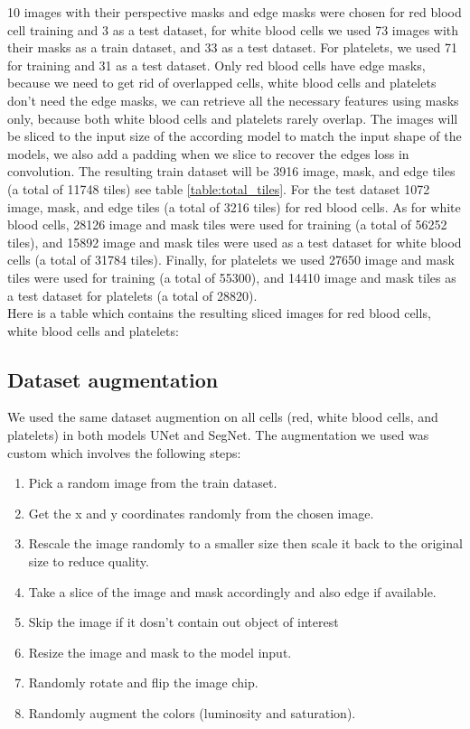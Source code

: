 \documentclass[conference]{IEEEtran}
\begin{document}
10 images with their perspective masks and edge masks were chosen for red blood cell training and 3 as a test dataset, for white blood cells we used 73 images with their masks as a train dataset, and 33 as a test dataset.
For platelets, we used 71 for training and 31 as a test dataset.
Only red blood cells have edge masks, because we need to get rid of overlapped cells, white blood cells and platelets don't need the edge masks, we can retrieve all the necessary features using masks only, because both white blood cells and platelets rarely overlap.
The images will be sliced to the input size of the according model to match the input shape of the models, we also add a padding when we slice to recover the edges loss in convolution.
The resulting train dataset will be 3916 image, mask, and edge tiles (a total of 11748 tiles) see table \ref{table:total_tiles}.
For the test dataset 1072 image, mask, and edge tiles (a total of 3216 tiles) for red blood cells.
As for white blood cells, 28126 image and mask tiles were used for training (a total of 56252 tiles), and 15892 image and mask tiles were used as a test dataset for white blood cells (a total of 31784 tiles).
Finally, for platelets we used 27650 image and mask tiles were used for training (a total of 55300), and 14410 image and mask tiles as a test dataset for platelets (a total of 28820).\\
Here is a table which contains the resulting sliced images for red blood cells, white blood cells and platelets:



\subsection{Dataset augmentation}
\hspace{\parindent}
We used the same dataset augmention on all cells (red, white blood cells, and platelets) in both models UNet and SegNet.
The augmentation we used was custom which involves the following steps:
\begin{enumerate}
    \item Pick a random image from the train dataset.
    \item Get the x and y coordinates randomly from the chosen image.
    \item Rescale the image randomly to a smaller size then scale it back to the original size to reduce quality.
    \item Take a slice of the image and mask accordingly and also edge if available.
    \item Skip the image if it dosn't contain out object of interest
    \item Resize the image and mask to the model input.
    \item Randomly rotate and flip the image chip.
    \item Randomly augment the colors (luminosity and saturation).
\end{enumerate}
\end{document}
